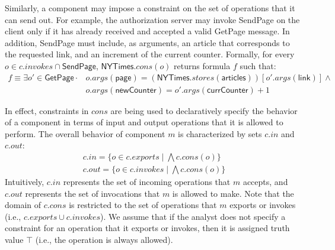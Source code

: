 Similarly, a component may impose a constraint on the set of operations
that it can send out. For example, the authorization server may invoke
\textsf{SendPage} on the client only if it has already received and
accepted a valid \textsf{GetPage} message. In addition,
\textsf{SendPage} must include, as arguments, an article that
corresponds to the requested link, and an increment of the current
counter. Formally, for every $o \in c.invokes \cap \textsf{SendPage}$,
$\textsf{NYTimes}.cons(o)$ returns formula $f$ such that:
\begin{align*}
f \equiv \exists o' \in \textsf{GetPage} \cdot & o.args(\textsf{page}) =
(\textsf{NYTimes}.stores(\textsf{articles}))[o'.args(\textsf{link})]
\land \\
& o.args(\textsf{newCounter}) = o'.args(\textsf{currCounter}) + 1
\end{align*}

In effect, constraints in $cons$ are being used to
declaratively specify the behavior of a component in terms of input and
output operations that it is allowed to perform. The overall behavior
of component $m$ is characterized by sets $c.in$ and $c.out$:
\begin{align*}
c.in = \{ o \in c.exports \;|\; \bigwedge c.cons(o) \} \\
c.out = \{ o \in c.invokes \;|\; \bigwedge c.cons(o) \}
\end{align*}
Intuitively, $c.in$ represents the set of incoming operations that $m$
accepts, and $c.out$ represents the set of invocations that $m$ is
allowed to make. Note that the domain of $c.cons$ is restricted to
the set of operations that $m$ exports or invokes (i.e., $c.exports
\cup c.invokes$). We assume that if the analyst does not specify a
constraint for an operation that it exports or invokes,
then it is assigned truth value $\top$ (i.e., the operation is always
allowed).

%
